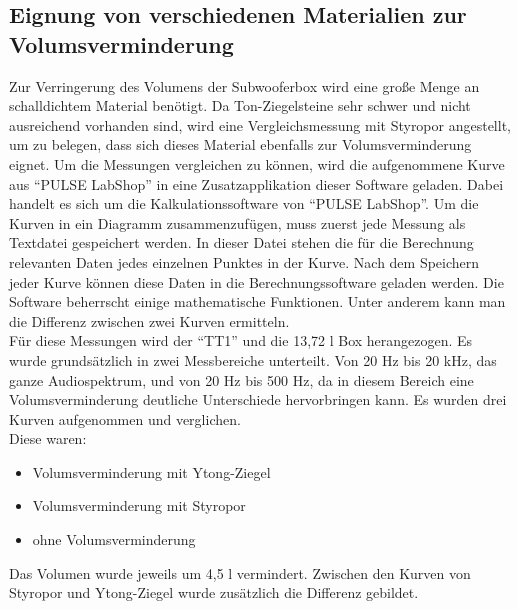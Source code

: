 \subsection{Eignung von verschiedenen Materialien zur Volumsverminderung}\label{subsec:4.4.1}
Zur Verringerung des Volumens der Subwooferbox wird eine große Menge an schalldichtem Material benötigt.
Da Ton-Ziegelsteine sehr schwer und nicht ausreichend vorhanden sind, wird eine Vergleichsmessung mit Styropor angestellt, um zu belegen, dass sich dieses Material ebenfalls zur Volumsverminderung eignet.
Um die Messungen vergleichen zu können, wird die aufgenommene Kurve aus \enquote{PULSE LabShop} in eine Zusatzapplikation dieser Software geladen.
Dabei handelt es sich um die Kalkulationssoftware von \enquote{PULSE LabShop}.
Um die Kurven in ein Diagramm zusammenzufügen, muss zuerst jede Messung als 
Textdatei gespeichert werden.
In dieser Datei stehen die für die Berechnung relevanten Daten jedes einzelnen Punktes in der Kurve.
Nach dem Speichern jeder Kurve können diese Daten in die Berechnungssoftware geladen werden.
Die Software beherrscht einige mathematische Funktionen.
Unter anderem kann man die Differenz zwischen zwei Kurven ermitteln.\\ 
Für diese Messungen wird der \enquote{TT1} und die 13,72 l Box herangezogen.
Es wurde grundsätzlich in zwei Messbereiche unterteilt.
Von 20 Hz bis 20 kHz, das ganze Audiospektrum, und von 20 Hz bis 500 Hz, da in diesem Bereich eine Volumsverminderung deutliche Unterschiede hervorbringen kann.
Es wurden drei Kurven aufgenommen und verglichen.\\
Diese waren:
\begin{itemize}
	\item Volumsverminderung mit Ytong-Ziegel
	\item Volumsverminderung mit Styropor
	\item ohne Volumsverminderung
\end{itemize}
Das Volumen wurde jeweils um 4,5 l vermindert.
Zwischen den Kurven von Styropor und Ytong-Ziegel wurde zusätzlich die Differenz gebildet.

